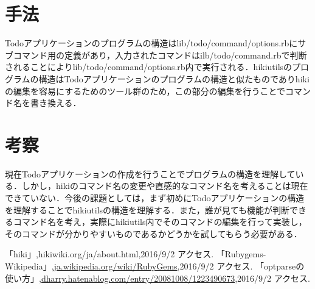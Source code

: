 \documentclass[a4j,twocolumn]{jsarticle}
\begin{document}
\section{手法}
Todoアプリケーションのプログラムの構造はlib/todo/command/options.rbにサブコマンド用の定義があり，入力されたコマンドはilb/todo/command.rbで判断されることによりlib/todo/command/options.rb内で実行される．hikiutilsのプログラムの構造はTodoアプリケーションのプログラムの構造と似たものでありhikiの編集を容易にするためのツール群のため，この部分の編集を行うことでコマンド名を書き換える．

\section{考察}
現在Todoアプリケーションの作成を行うことでプログラムの構造を理解している．しかし，hikiのコマンド名の変更や直感的なコマンド名を考えることは現在できていない．今後の課題としては，まず初めにTodoアプリケーションの構造を理解することでhikiutilsの構造を理解する．また，誰が見ても機能が判断できるコマンド名を考え，実際にhikiutils内でそのコマンドの編集を行って実装し，そのコマンドが分かりやすいものであるかどうかを試してもらう必要がある．

\begin{thebibliography}{9}
「hiki」,hikiwiki.org/ja/about.html,2016/9/2 アクセス.
「Rubygems-Wikipedia」,\url{ja.wikipedia.org/wiki/RubyGems},2016/9/2 アクセス.
「optparseの使い方」,\url{dharry.hatenablog.com/entry/20081008/1223490673},2016/9/2 アクセス.
\end{thebibliography}
\end{document}
